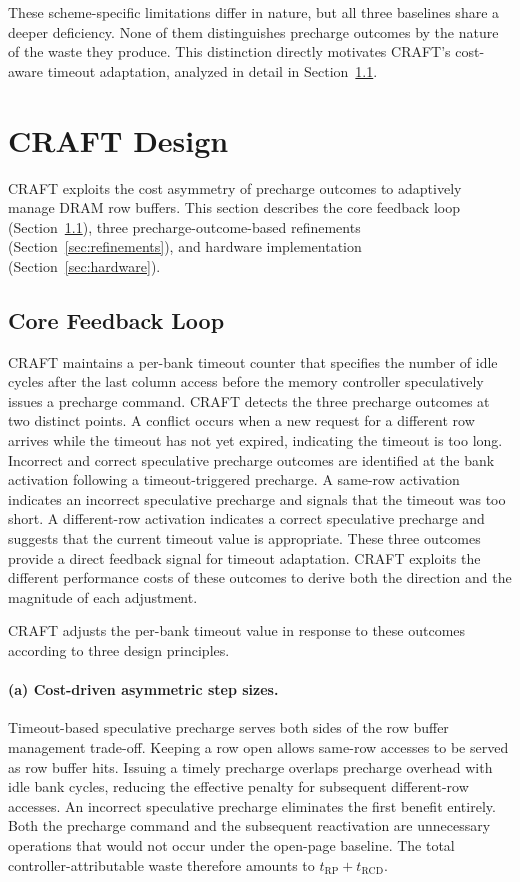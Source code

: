 \documentclass[runningheads]{llncs}
\begin{document}
These scheme-specific limitations differ in nature, but all three baselines share a deeper deficiency. None of them distinguishes precharge outcomes by the nature of the waste they produce. This distinction directly motivates CRAFT's cost-aware timeout adaptation, analyzed in detail in Section~\ref{sec:core}.

\section{CRAFT Design}

CRAFT exploits the cost asymmetry of precharge outcomes to adaptively manage DRAM row buffers. This section describes the core feedback loop (Section~\ref{sec:core}), three precharge-outcome-based refinements (Section~\ref{sec:refinements}), and hardware implementation (Section~\ref{sec:hardware}).

\subsection{Core Feedback Loop}
\label{sec:core}

CRAFT maintains a per-bank timeout counter that specifies the number of idle cycles after the last column access before the memory controller speculatively issues a precharge command.
CRAFT detects the three precharge outcomes at two distinct points.
A conflict occurs when a new request for a different row arrives while the timeout has not yet expired, indicating the timeout is too long.
Incorrect and correct speculative precharge outcomes are identified at the bank activation following a timeout-triggered precharge.
A same-row activation indicates an incorrect speculative precharge and signals that the timeout was too short.
A different-row activation indicates a correct speculative precharge and suggests that the current timeout value is appropriate.
These three outcomes provide a direct feedback signal for timeout adaptation.
CRAFT exploits the different performance costs of these outcomes to derive both the direction and the magnitude of each adjustment.

CRAFT adjusts the per-bank timeout value in response to these outcomes according to three design principles.

\paragraph{(a) Cost-driven asymmetric step sizes.}
Timeout-based speculative precharge serves both sides of the row buffer management trade-off. Keeping a row open allows same-row accesses to be served as row buffer hits. Issuing a timely precharge overlaps precharge overhead with idle bank cycles, reducing the effective penalty for subsequent different-row accesses. An incorrect speculative precharge eliminates the first benefit entirely. Both the precharge command and the subsequent reactivation are unnecessary operations that would not occur under the open-page baseline. The total controller-attributable waste therefore amounts to $t_\mathrm{RP} + t_\mathrm{RCD}$.
\end{document}
